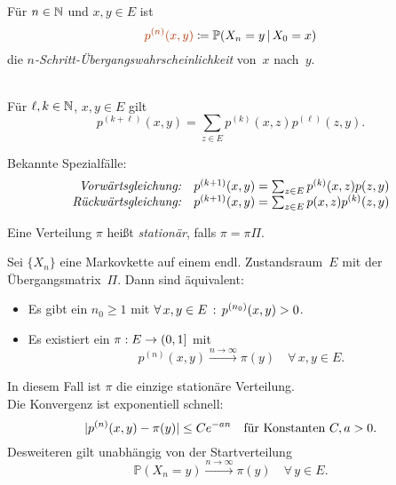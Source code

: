 \documentclass{cheat-sheet}
\renewcommand{\P}{\mathbb{P}} %
\newcommand{\Defn}[1]{\textcolor{DefinitionColor}{#1}}
\begin{document}
\begin{defn}
  Für $n \in \mathbb{N}$ und $x, y \in E$ ist
  \[
    \Defn{p^{(n)}(x, y)} \coloneqq \P(X_n=y \,|\, X_0=x)
  \]
  die \emph{$n$-Schritt-Übergangswahrscheinlichkeit} von~$x$ nach~$y$.
\end{defn}

\begin{lem} \mbox{}\\
  Für $\ell, k \in \mathbb{N}$, $x, y \in E$ gilt
  \[
    p^{(k + \ell)}(x, y) = {\sum}_{z \in E} p^{(k)}(x, z) p^{(\ell)}(z, y).
  \]
\end{lem}

\begin{bem}
  Bekannte Spezialfälle:
  \[
    \begin{array}{r l}
      \text{\textit{Vorwärtsgleichung:}} & p^{(k+1)}(x, y) = {\sum}_{z \in E} \, p^{(k)}(x, z) p(z, y) \\
      \text{\textit{Rückwärtsgleichung:}} & p^{(k+1)}(x, y) = {\sum}_{z \in E} \, p(x, z) p^{(k)}(z, y)
    \end{array}
  \]
\end{bem}




\begin{defn}
  Eine Verteilung $\pi$ heißt \emph{stationär}, falls $\pi = \pi \Pi$.
\end{defn}

\begin{satz}
  Sei $\{ X_n \}$ eine Markovkette auf einem endl. Zustandsraum~$E$ mit der Übergangsmatrix~$\Pi$.
  Dann sind äquivalent:
  \begin{itemize}
    \item Es gibt ein $n_0 \geq 1$ mit $\forall \, {x, y \in E} \,:\, p^{(n_0)}(x, y) > 0$.
    \item Es existiert ein $\pi : E \to \left( 0, 1 \right]$ mit
    \[
      p^{(n)}(x, y) \xrightarrow{n \to \infty} \pi(y)
      \quad \forall \, x, y \in E.
    \]
  \end{itemize}
  In diesem Fall ist $\pi$ die einzige stationäre Verteilung. \\
  Die Konvergenz ist exponentiell schnell:
  \[
    \lvert p^{(n)}(x, y) - \pi(y)\rvert \leq C e^{- a n} \quad
    \text{für Konstanten $C, a > 0$.}
  \]
  Desweiteren gilt unabhängig von der Startverteilung
  \[
    \P(X_n = y) \xrightarrow{n \to \infty} \pi(y) \quad
    \forall \, y \in E.
  \]
\end{satz}
\end{document}
